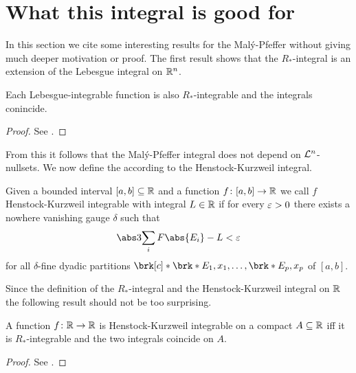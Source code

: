 \section{What this integral is good for}

In this section we cite some interesting results for the Malý-Pfeffer without giving much deeper motivation or proof. The first result shows that the $R_*$-integral is an extension of the Lebesgue integral on $\mathbb{R}^n$.

\begin{proposition}
Each Lebesgue-integrable function is also $R_*$-integrable and the integrals conincide.
\end{proposition}
\begin{proof}
See \cite[Proposition 3.5]{Pfe2016}.
\end{proof}

\noindent
From this it follows that the Malý-Pfeffer integral does not depend on $\mathcal{L}^n$-nullsets. We now define the according to \cite[Appendix H]{Coh2013} the Henstock-Kurzweil integral.

\begin{definition}
Given a bounded  interval $[a,b]\subseteq\mathbb{R}$ and a function $f\colon[a,b]\to\mathbb{R}$ we call $f$ Henstock-Kurzweil integrable with integral $L\in\mathbb{R}$ if for every $\varepsilon>0$ there exists a nowhere vanishing gauge $\delta$ such that
\begin{align*}
	\abs3{\sum_iF\abs{E_i}-L}<\e
\end{align*}
for all $\delta$-fine dyadic partitions $\brk[c]*{\brk*{E_1,x_1},\dots,\brk*{E_p,x_p}}$ of $[a,b]$.
\end{definition}

Since the definition of the $R_*$-integral and the Henstock-Kurzweil integral on $\mathbb{R}$ the following result should not be too surprising. 

\begin{proposition}
A function $f\colon\mathbb{R}\to\mathbb{R}$ is Henstock-Kurzweil integrable on a compact $A\subseteq\mathbb{R}$ iff it is $R_*$-integrable and the two integrals coincide on $A$.
\end{proposition}
\begin{proof}
See \cite[Proposition 3.6]{Pfe2016}.
\end{proof}

